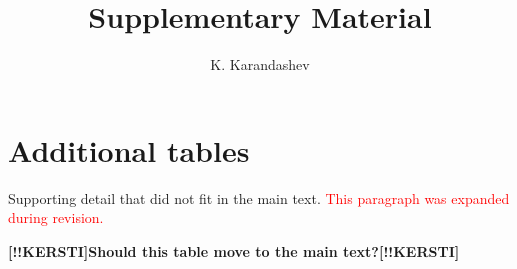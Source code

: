 \documentclass[12pt]{article}
\title{Supplementary Material}
\author{K. Karandashev}
\newcommand{\revised}[1]{\textcolor{red}{#1}}
\newcommand{\collaboratorcomment}[1]{\textbf{[!!KERSTI]#1[!!KERSTI]}}
\begin{document}
\maketitle

\section{Additional tables}

Supporting detail that did not fit in the main text.
\revised{This paragraph was expanded during revision.}

\collaboratorcomment{Should this table move to the main text?}
\end{document}
